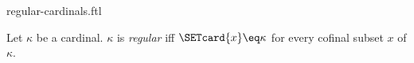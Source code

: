 \documentclass{naproche-library}
\begin{document}
\begin{smodule}[title=Regular Cardinals]{regular-cardinals.ftl}

\begin{definition}[forthel,id=SET_THEORY_06_6532641205487950]
  Let $\kappa$ be a cardinal.
  $\kappa$ is \emph{regular} iff $\SETcard{x} \eq \kappa$ for every cofinal subset $x$ of $\kappa$.
\end{definition}
\end{smodule}
\end{document}
